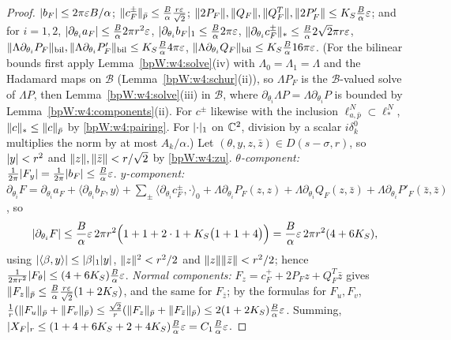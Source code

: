 \begin{proof}
$\lvert b_F\rvert\le2\pi\varepsilon B/\alpha$; $\lVert c^\pm_F\rVert_{\bar p}\le\frac{B}{\alpha}\frac{r\varepsilon}{\sqrt2}$;
$\lVert 2P_F\rVert,\lVert Q_F\rVert,\lVert Q^T_F\rVert,\lVert 2P'_F\rVert\le K_S\frac{B}{\alpha}\varepsilon$; and for $i=1,2$,
$\lvert \partial_{\theta_i}a_F\rvert\le\frac B\alpha2\pi r^2\varepsilon$, $\lvert \partial_{\theta_i}b_F\rvert_1\le\frac B\alpha2\pi\varepsilon$,
$\lVert \partial_{\theta_i}c^\pm_F\rVert_*\le\frac B\alpha2\sqrt2\pi r\varepsilon$,
$\lVert \Lambda\partial_{\theta_i}P_F\rVert_{\rm bil},\lVert \Lambda\partial_{\theta_i}P'_F\rVert_{\rm bil}\le K_S\frac B\alpha4\pi\varepsilon$,
$\lVert \Lambda\partial_{\theta_i}Q_F\rVert_{\rm bil}\le K_S\frac B\alpha16\pi\varepsilon$. (For the bilinear bounds first apply
Lemma~\ref{bpW:w4:solve}(iv) with $\Lambda_0=\Lambda_1=\Lambda$ and the Hadamard maps on $\mathcal B$
(Lemma~\ref{bpW:w4:schur}(ii)), so $\Lambda P_F$ is the $\mathcal B$-valued solve of $\Lambda P$, then
Lemma~\ref{bpW:w4:solve}(iii) in $\mathcal B$, where $\partial_{\theta_i}\Lambda P=\Lambda\partial_{\theta_i}P$ is bounded by
Lemma~\ref{bpW:w4:components}(ii). For $c^\pm$ likewise with the inclusion $\ell^N_{a,\bar p}\subset\ell^N_*$,
$\lVert c\rVert_*\le\lVert c\rVert_{\bar p}$ by \eqref{bpW:w4:pairing}. For $\lvert \cdot\rvert_1$ on $\mathbb{C}^2$, division by a scalar $i\delta^0_k$
multiplies the norm by at most $A_k/\alpha$.)
\label{stepW:w4:assembly}
Let $(\theta,y,z,\bar z)\in D(s-\sigma,r)$, so $\lvert y\rvert<r^2$ and $\lVert z\rVert,\lVert \bar z\rVert<r/\sqrt2$ by \eqref{bpW:w4:zu}.
\emph{$\theta$-component:} $\frac1{2\pi}\lvert F_y\rvert=\frac1{2\pi}\lvert b_F\rvert\le\frac B\alpha\varepsilon$.
\emph{$y$-component:} $\partial_{\theta_i}F=\partial_{\theta_i}a_F+\langle\partial_{\theta_i}b_F,y\rangle+\sum_\pm\langle\partial_{\theta_i}c^\pm_F,\cdot\rangle_0
+\Lambda\partial_{\theta_i}P_F(z,z)+\Lambda\partial_{\theta_i}Q_F(z,\bar z)+\Lambda\partial_{\theta_i}P'_F(\bar z,\bar z)$, so
\[\lvert \partial_{\theta_i}F\rvert\le\frac B\alpha\varepsilon\,2\pi r^2\Bigl(1+1+2\cdot1+K_S\bigl(1+1+4\bigr)\Bigr)
=\frac B\alpha\varepsilon\,2\pi r^2(4+6K_S),\]
using $\lvert \langle\beta,y\rangle\rvert\le\lvert \beta\rvert_1\lvert y\rvert$, $\lVert z\rVert^2<r^2/2$ and $\lVert z\rVert\lVert \bar z\rVert<r^2/2$; hence
$\frac1{2\pi r^2}\lvert F_\theta\rvert\le(4+6K_S)\frac B\alpha\varepsilon$.
\emph{Normal components:} $F_z=c^+_F+2P_Fz+Q_F^T\bar z$ gives
$\lVert F_z\rVert_{\bar p}\le\frac B\alpha\frac{r\varepsilon}{\sqrt2}(1+2K_S)$, and the same for $F_{\bar z}$; by the formulas for
$F_u,F_v$, $\frac1r(\lVert F_u\rVert_{\bar p}+\lVert F_v\rVert_{\bar p})\le\frac{\sqrt2}r(\lVert F_z\rVert_{\bar p}+\lVert F_{\bar z}\rVert_{\bar p})\le
2(1+2K_S)\frac B\alpha\varepsilon$. Summing, $\lvert X_F\rvert_r\le(1+4+6K_S+2+4K_S)\frac B\alpha\varepsilon=C_1\frac B\alpha\varepsilon$.

\end{proof}
